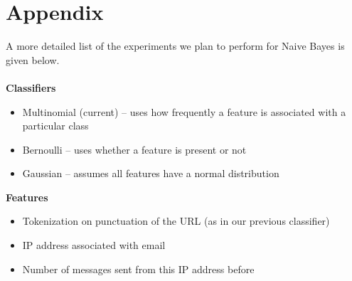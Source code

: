 \documentclass[cs,midyearupdate]{hmcclinic}
\begin{document}

\newpage

\section{Appendix}

A more detailed list of the experiments we plan to perform for Naive Bayes is given below.
\\\\
\textbf{Classifiers}
\begin{itemize} \itemsep0em
\item Multinomial (current) -- uses how frequently a feature is associated with a particular class
\item Bernoulli -- uses whether a feature is present or not
\item Gaussian -- assumes all features have a normal distribution
\end{itemize}


\noindent \textbf{Features}
\begin{itemize} \itemsep0em
\item Tokenization on punctuation of the URL (as in our previous classifier)
\item IP address associated with email
\item Number of messages sent from this IP address before
\end{itemize}


%
%
%
\end{document}
